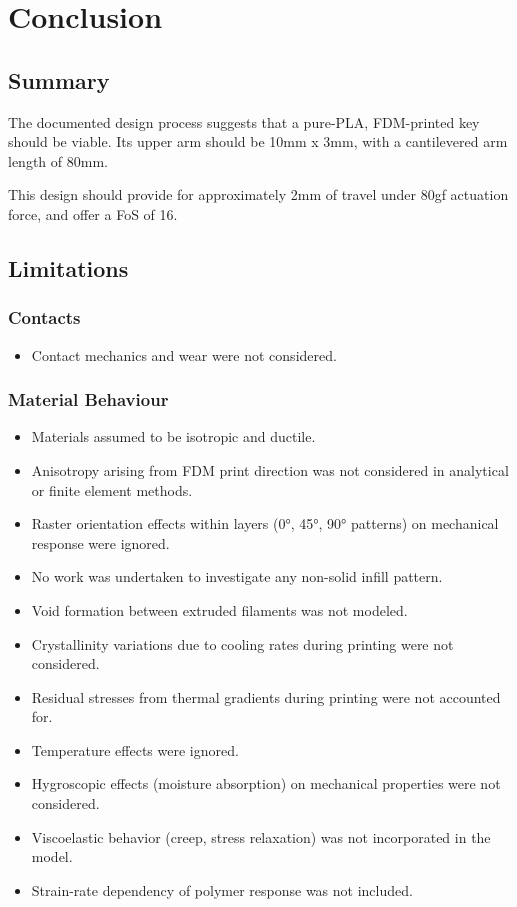 \documentclass[10pt]{article}
\begin{document}
\section{Conclusion}
\subsection{Summary}
The documented design process suggests that a pure-PLA, FDM-printed key should be viable. Its upper
arm should be 10mm x 3mm, with a cantilevered arm length of 80mm.

This design should provide for approximately 2mm of travel under 80gf actuation force, and offer a
FoS of 16.

\subsection{Limitations} \label{sec:limitations}
\subsubsection{Contacts}
\begin{itemize}[leftmargin=*]
	\item Contact mechanics and wear were not considered.
\end{itemize}

\subsubsection{Material Behaviour}
\begin{itemize}[leftmargin=*]
	\item Materials assumed to be isotropic and ductile.
	\item Anisotropy arising from FDM print direction was not considered in analytical or finite element
	      methods.
	\item Raster orientation effects within layers (0°, 45°, 90° patterns) on mechanical response were
	      ignored.
	\item No work was undertaken to investigate any non-solid infill pattern.
	\item Void formation between extruded filaments was not modeled.
	\item Crystallinity variations due to cooling rates during printing were not considered.
	\item Residual stresses from thermal gradients during printing were not accounted for.
	\item Temperature effects were ignored.
	\item Hygroscopic effects (moisture absorption) on mechanical properties were not considered.
	\item Viscoelastic behavior (creep, stress relaxation) was not incorporated in the model.
	\item Strain-rate dependency of polymer response was not included.
\end{itemize}
\end{document}

